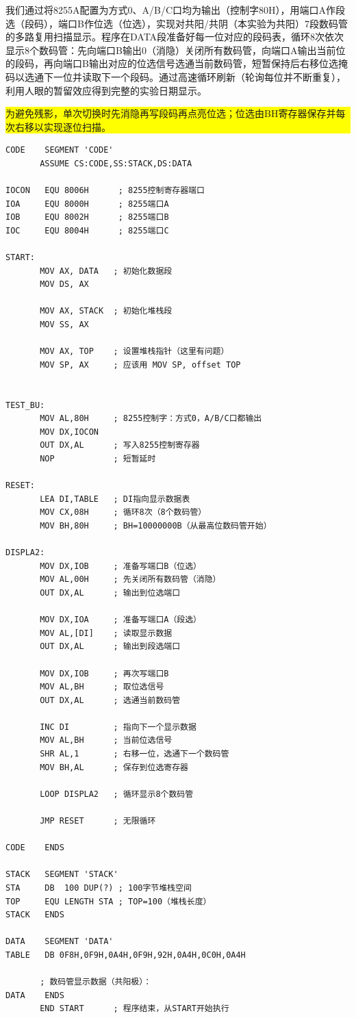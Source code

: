 \documentclass[UTF8]{article}
\begin{document}
\begin{bluebox}
我们通过将8255A配置为方式0、A/B/C口均为输出（控制字80H），用端口A作段选（段码），端口B作位选（位选），实现对共阳/共阴（本实验为共阳）7段数码管的多路复用扫描显示。程序在DATA段准备好每一位对应的段码表，循环8次依次显示8个数码管：先向端口B输出0（消隐）关闭所有数码管，向端口A输出当前位的段码，再向端口B输出对应的位选信号选通当前数码管，短暂保持后右移位选掩码以选通下一位并读取下一个段码。通过高速循环刷新（轮询每位并不断重复），利用人眼的暂留效应得到完整的实验日期显示。\colorbox{yellow}{\parbox{\linewidth}{为避免残影，单次切换时先消隐再写段码再点亮位选；位选由BH寄存器保存并每次右移以实现逐位扫描。}}
\end{bluebox}

\begin{lstlisting}[language={[x86masm]Assembler}]
CODE    SEGMENT 'CODE'
       ASSUME CS:CODE,SS:STACK,DS:DATA
       
IOCON   EQU 8006H      ; 8255控制寄存器端口
IOA     EQU 8000H      ; 8255端口A
IOB     EQU 8002H      ; 8255端口B
IOC     EQU 8004H      ; 8255端口C
 
START:
       MOV AX, DATA   ; 初始化数据段
       MOV DS, AX
 
       MOV AX, STACK  ; 初始化堆栈段
       MOV SS, AX
 
       MOV AX, TOP    ; 设置堆栈指针（这里有问题）
       MOV SP, AX     ; 应该用 MOV SP, offset TOP
       
       
TEST_BU:
       MOV AL,80H     ; 8255控制字：方式0，A/B/C口都输出
       MOV DX,IOCON
       OUT DX,AL      ; 写入8255控制寄存器
       NOP            ; 短暂延时
       
RESET:  
       LEA DI,TABLE   ; DI指向显示数据表
       MOV CX,08H     ; 循环8次（8个数码管）
       MOV BH,80H     ; BH=10000000B（从最高位数码管开始）
       
DISPLA2:
       MOV DX,IOB     ; 准备写端口B（位选）
       MOV AL,00H     ; 先关闭所有数码管（消隐）
       OUT DX,AL      ; 输出到位选端口
       
       MOV DX,IOA     ; 准备写端口A（段选）
       MOV AL,[DI]    ; 读取显示数据
       OUT DX,AL      ; 输出到段选端口
       
       MOV DX,IOB     ; 再次写端口B
       MOV AL,BH      ; 取位选信号
       OUT DX,AL      ; 选通当前数码管
       
       INC DI         ; 指向下一个显示数据
       MOV AL,BH      ; 当前位选信号
       SHR AL,1       ; 右移一位，选通下一个数码管
       MOV BH,AL      ; 保存到位选寄存器
       
       LOOP DISPLA2   ; 循环显示8个数码管
       
       JMP RESET      ; 无限循环
 
CODE    ENDS
     
STACK   SEGMENT 'STACK'
STA     DB  100 DUP(?) ; 100字节堆栈空间
TOP     EQU LENGTH STA ; TOP=100（堆栈长度）
STACK   ENDS      
     
DATA    SEGMENT 'DATA'
TABLE   DB 0F8H,0F9H,0A4H,0F9H,92H,0A4H,0C0H,0A4H
 
       ; 数码管显示数据（共阳极）：
DATA    ENDS
       END START      ; 程序结束，从START开始执行
\end{lstlisting}
\end{document}
